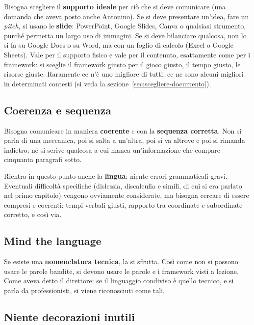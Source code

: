 Bisogna scegliere il \textbf{supporto ideale} per ciò che si deve comunicare
(una domanda che aveva posto anche Antonino). Se si deve presentare un'idea,
fare un \emph{pitch}, si usano le \textbf{slide}: PowerPoint, Google Slides,
Canva o qualsiasi strumento, purché permetta un largo uso di immagini. Se si
deve bilanciare qualcosa, non lo si fa su Google Docs o su Word, ma con un
foglio di calcolo (Excel o Google Sheets). Vale per il supporto fisico e vale
per il contenuto, esattamente come per i framework: si sceglie il framework
giusto per il gioco giusto, il tempo giusto, le risorse giuste. Raramente ce
n'è uno migliore di tutti; ce ne sono alcuni migliori in determinati contesti
(si veda la sezione~\ref{sec:scegliere-documento}).

\subsection{Coerenza e sequenza}

Bisogna comunicare in maniera \textbf{coerente} e con la \textbf{sequenza
corretta}. Non si parla di una meccanica, poi si salta a un'altra, poi si va
altrove e poi si rimanda indietro; né si scrive qualcosa a cui manca
un'informazione che compare cinquanta paragrafi sotto.

Rientra in questo punto anche la \textbf{lingua}: niente errori grammaticali
gravi. Eventuali difficoltà specifiche (dislessia, discalculia e simili, di
cui si era parlato nel primo capitolo) vengono ovviamente considerate, ma
bisogna cercare di essere compresi e coerenti: tempi verbali giusti, rapporto
tra coordinate e subordinate corretto, e così via.

\subsection{Mind the language}

Se esiste una \textbf{nomenclatura tecnica}, la si sfrutta. Così come non si
possono usare le parole bandite, si devono usare le parole e i framework visti
a lezione. Come aveva detto il direttore: se il linguaggio condiviso è quello
tecnico, e si parla da professionisti, si viene riconosciuti come tali.

\subsection{Niente decorazioni inutili}

